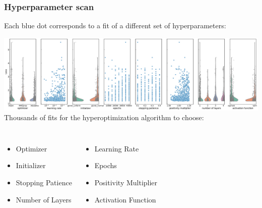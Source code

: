 \begin{frame}
    \frametitle{Hyperparameter scan} 
    Each blue dot corresponds to a fit of a different set of hyperparameters:
    { 
        \centering 

        \includegraphics[width=\textwidth]{juan_future_hyperopt/dis-fullpage.pdf}
        Thousands of fits for the hyperoptimization algorithm to choose:

        \begin{columns} \small
            \column{0.35\paperwidth}
            \begin{itemize}
                \item[\bct] Optimizer
                \item[\bct] Initializer
                \item[\bct] Stopping Patience
                \item[\bct] Number of Layers
            \end{itemize}
            \column{0.35\paperwidth}
            \begin{itemize}
                \item[\bct] Learning Rate
                \item[\bct] Epochs
                \item[\bct] Positivity Multiplier
                \item[\bct] Activation Function
            \end{itemize}
        \end{columns}
    } \vfill
\end{frame}

